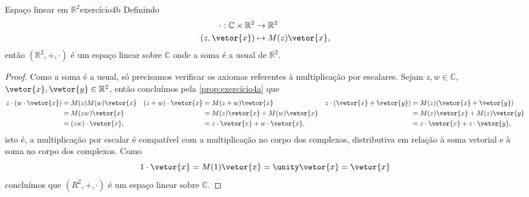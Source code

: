 \begin{proposition}{Espaço linear em \(\mathbb{R}^2\)}{exercício4b}
    Definindo
    \begin{align*}
        \cdot : \mathbb{C} \times \mathbb{R}^2 &\to \mathbb{R}^2\\
                                 (z,\vetor{x}) &\mapsto M(z)\vetor{x},
    \end{align*}
    então \((\mathbb{R}^2, +, \cdot)\) é um espaço linear sobre \(\mathbb{C}\) onde a soma é a usual de \(\mathbb{R}^2\).
\end{proposition}
\begin{proof}
    Como a soma é a usual, só precisamos verificar os axiomas referentes à multiplicação por escalares. Sejam \(z, w \in \mathbb{C}\), \(\vetor{x}, \vetor{y} \in \mathbb{R}^2\), então concluímos pela \cref{prop:exercício4a} que
    \begin{align*}
        z\cdot(w\cdot \vetor{x}) &= M(z)M(w)\vetor{x}&
        (z + w)\cdot\vetor{x} &= M(z + w)\vetor{x} &
        z\cdot(\vetor{x} + \vetor{y}) &= M(z)(\vetor{x} + \vetor{y})\\
                        &= M(zw)\vetor{x} &
                        &= M(z)\vetor{x} + M(w)\vetor{x} &
                        &= M(z) \vetor{x} + M(z) \vetor{y}\\
                        &= (zw)\cdot\vetor{x},&
                        &=z\cdot\vetor{x} + w\cdot\vetor{x},&
                        &= z\cdot\vetor{x} + z\cdot\vetor{y},
    \end{align*}
    isto é, a multiplicação por escalar é compatível com a multiplicação no corpo dos complexos, distributiva em relação à soma vetorial e à soma no corpo dos complexos. Como
    \begin{equation*}
        1\cdot\vetor{x} = M(1) \vetor{x} = \unity \vetor{x} = \vetor{x}
    \end{equation*}
    concluímos que \((R^2, + , \cdot)\) é um espaço linear sobre \(\mathbb{C}\).
\end{proof}

